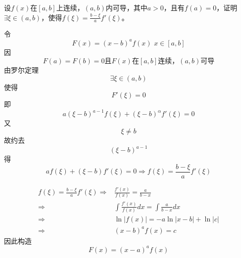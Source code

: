 \begin{example}
	设$f(x)$在$[a,b]$上连续，$(a,b)$内可导，其中$a>0$，且有$f(a)=0$，证明$\exists\xi\in(a,b)$，使得$f(\xi)=\frac{b-\xi}{a}f'(\xi)$。
\end{example}
	\begin{newproof}
		令\[F\left( x \right) =\left( x-b \right) ^af\left( x \right) \,\,     x\in \left[ a,b \right] \]
		因\[F\left( a \right) =F\left( b \right) =\text{0且}F\left( x \right) \text{在}\left[ a,b \right] \text{连续，}\left( a,b \right) \text{可导}\]
		由罗尔定理\[\exists \xi \in (a,b)\]
		使得\[F'\left( \xi \right) =0\]
		即\[a\left( \xi -b \right) ^{a-1}f\left( \xi \right) +\left( \xi -b \right) ^{\alpha}f'\left( \xi \right) =0\]
		又\[\xi \ne b\]
		故约去\[\left( \xi -b \right) ^{a-1}\]
		得\[af\left( \xi \right) +\left( \xi -b \right) f'\left( \xi \right) =0\Longrightarrow f\left( \xi \right) =\frac{b-\xi}{a}f'\left( \xi \right) \]
	\end{newproof}
	\begin{note}
		\begin{align*}
			f\left( \xi \right) =\frac{b-\xi}{a}f'\left( \xi \right) 
			\Longrightarrow {}&
			\frac{f'\left( x \right)}{f\left( x \right)}=\frac{a}{b-x}\\
			\Longrightarrow {}&
			\int{\frac{f'\left( x \right)}{f\left( x \right)}}dx=\int{\frac{a}{b-x}dx}\\
			\Longrightarrow {}&
			\ln \left| f\left( x \right) \right|=-a\ln \left| x-b \right|+\ln \left| c \right|\\
			\Longrightarrow {}&
			\left( x-b \right) ^af\left( x \right) =c
		\end{align*}
		因此构造\[F\left( x \right) =\left( x-a \right) ^af\left( x \right) \]
	\end{note}

